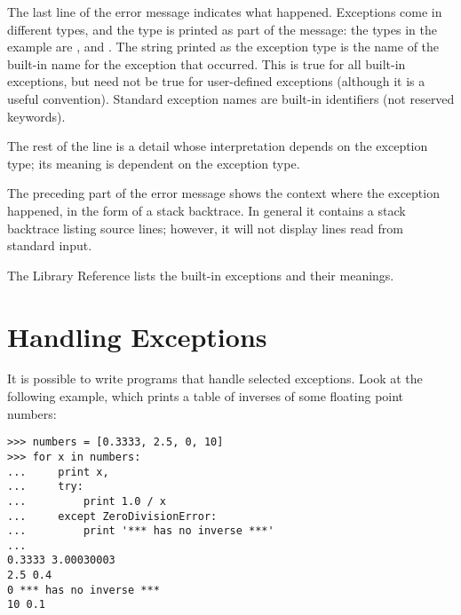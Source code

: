 \documentclass{manual}
\begin{document}
The last line of the error message indicates what happened.
Exceptions come in different types, and the type is printed as part of
the message: the types in the example are
,
and
.
The string printed as the exception type is the name of the built-in
name for the exception that occurred.  This is true for all built-in
exceptions, but need not be true for user-defined exceptions (although
it is a useful convention).
Standard exception names are built-in identifiers (not reserved
keywords).

The rest of the line is a detail whose interpretation depends on the
exception type; its meaning is dependent on the exception type.

The preceding part of the error message shows the context where the
exception happened, in the form of a stack backtrace.
In general it contains a stack backtrace listing source lines; however,
it will not display lines read from standard input.

The Library Reference lists the built-in exceptions and their
meanings.

\section{Handling Exceptions}
\label{handling}

It is possible to write programs that handle selected exceptions.
Look at the following example, which prints a table of inverses of
some floating point numbers:

\begin{verbatim}
>>> numbers = [0.3333, 2.5, 0, 10]
>>> for x in numbers:
...     print x,
...     try:
...         print 1.0 / x
...     except ZeroDivisionError:
...         print '*** has no inverse ***'
...     
0.3333 3.00030003
2.5 0.4
0 *** has no inverse ***
10 0.1
\end{verbatim}
\end{document}
